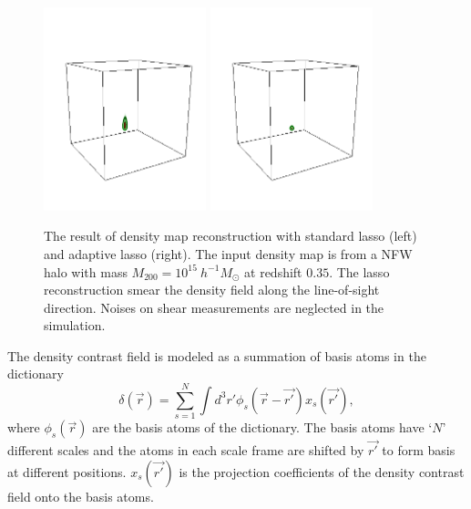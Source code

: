 \documentclass[twocolumn]{aastex62}
\begin{document}
\begin{figure}[!t]
\centering
\includegraphics[width=0.42\textwidth]{delta-3-7-pz-nn-lasso.png}
\includegraphics[width=0.42\textwidth]{delta-3-7-pz-nn-alasso.png}
\caption{The result of density map reconstruction with standard lasso (left) and adaptive lasso (right). The input density 
        map is from a NFW halo with mass $M_{200}=10^{15} ~h^{-1}M_{\odot}$ at redshift $0.35$. The lasso reconstruction 
        smear the density field along the line-of-sight direction. Noises on shear measurements are neglected in the 
        simulation.} \label{fig-lassoVsadaLasso}
\end{figure}

The density contrast field is modeled as a summation of basis atoms in the dictionary 
\begin{equation}\label{eq-x2delta}
\delta(\vec{r}) = \sum_{s=1}^{N} \int d^3 r' \phi_s(\vec{r}-\vec{r'}) x_s(\vec{r'}),
\end{equation}
where $\phi_s(\vec{r})$ are the basis atoms of the dictionary. The basis atoms have `$N$' different scales and the atoms
in each scale frame are shifted by $\vec{r'}$ to form basis at different positions. $x_s(\vec{r'})$ is the projection 
coefficients of the density contrast field onto the basis atoms.
\end{document}
